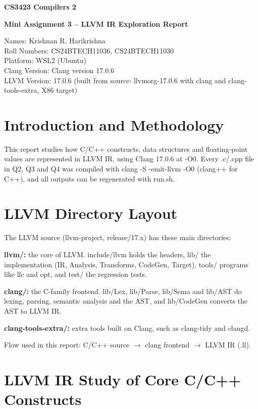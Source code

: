 \documentclass[11pt,a4paper]{article}
\begin{document}
\begin{center}
{\Large\bfseries CS3423 Compilers 2\par}
\vspace{4pt}
{\large\bfseries Mini Assignment 3 -- LLVM IR Exploration Report\par}
\end{center}

\noindent Names: Krishnan R, Harikrishna\\
Roll Numbers: CS24BTECH11036, CS24BTECH11030\\
Platform: WSL2 (Ubuntu)\\
Clang Version: Clang version 17.0.6\\
LLVM Version: 17.0.6 (built from source: llvmorg-17.0.6 with clang and clang-tools-extra, X86 target)

\tableofcontents

\clearpage
\section*{Introduction and Methodology}

This report studies how C/C++ constructs, data structures and floating-point values are represented in LLVM IR, using Clang 17.0.6 at -O0. Every .c/.cpp file in Q2, Q3 and Q4 was compiled with clang -S -emit-llvm -O0 (clang++ for C++), and all outputs can be regenerated with run.sh.

\section{LLVM Directory Layout}

The LLVM source (llvm-project, release/17.x) has these main directories:

\textbf{llvm/: }the core of LLVM. include/llvm holds the headers, lib/ the implementation (IR, Analysis, Transforms, CodeGen, Target), tools/ programs like llc and opt, and test/ the regression tests.

\textbf{clang/: }the C-family frontend. lib/Lex, lib/Parse, lib/Sema and lib/AST do lexing, parsing, semantic analysis and the AST, and lib/CodeGen converts the AST to LLVM IR.

\textbf{clang-tools-extra/: }extra tools built on Clang, such as clang-tidy and clangd.

Flow used in this report: C/C++ source $\rightarrow$ clang frontend $\rightarrow$ LLVM IR (.ll).

\section{LLVM IR Study of Core C/C++ Constructs}
\end{document}
